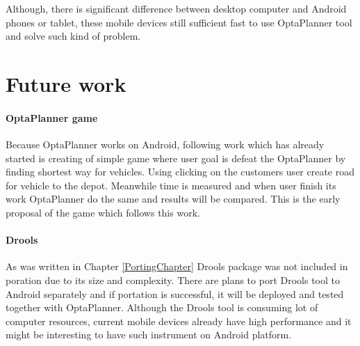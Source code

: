 Although, there is significant difference between desktop computer and Android phones or tablet, these mobile devices
still sufficient fast to use OptaPlanner tool and solve such kind of problem.




\section{Future work}

\paragraph{OptaPlanner game}
Because OptaPlanner works on Android, following work which has already started is creating of simple game where user
goal is defeat the OptaPlanner by finding shortest way for vehicles. Using clicking on the customers user create road
for vehicle to the depot. Meanwhile time is measured and when user finish its work OptaPlanner do the same and results
will be compared. This is the early proposal of the game which follows this work.

\paragraph{Drools}
As was written in Chapter \ref{PortingChapter} Drools package was not included in poration due to its size and
complexity. There are plans to port Drools tool to Android separately and if portation is successful, it will be
deployed and tested together with OptaPlanner. Although the Drools tool is consuming lot of computer resources, current
mobile devices already have high performance and it might be interesting to have such instrument on Android platform.
